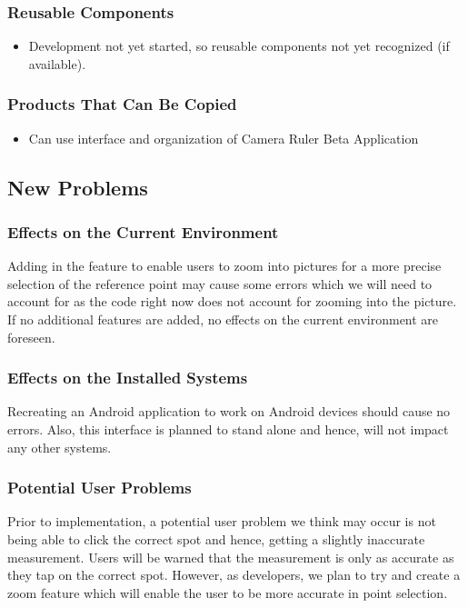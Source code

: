 \documentclass[12pt, titlepage]{article}
\begin{document}
\subsubsection{Reusable Components}
\begin{itemize}
    \item Development not yet started, so reusable components not yet recognized (if available).
\end{itemize}

\subsubsection{Products That Can Be Copied}
\begin{itemize}
\item Can use interface and organization of Camera Ruler Beta Application
\end{itemize}

\subsection{New Problems}
\subsubsection{Effects on the Current Environment}
Adding in the feature to enable users to zoom into pictures for a more precise selection of the reference point may cause some errors which we will need to account for as the code right now does not account for zooming into the picture. If no additional features are added, no effects on the current environment are foreseen.

\subsubsection{Effects on the Installed Systems}
Recreating an Android application to work on Android devices should cause no errors. Also, this interface is planned to stand alone and hence, will not impact any other systems.

\subsubsection{Potential User Problems}
Prior to implementation, a potential user problem we think may occur is not being able to click the correct spot and hence, getting a slightly inaccurate measurement. Users will be warned that the measurement is only as accurate as they tap on the correct spot. However, as developers, we plan to try and create a zoom feature which will enable the user to be more accurate in point selection. 
\end{document}

